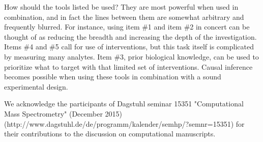 \documentclass[journal=jacsat,manuscript=article]{achemso}
\begin{document}
How should the tools listed be used? They are most powerful when used in
combination, and in fact the lines between them are somewhat arbitrary
and frequently blurred. For instance, using item \#1 and item \#2 in
concert can be thought of as reducing the breadth and increasing the
depth of the investigation. Items \#4 and \#5 call for use of
interventions, but this task itself is complicated by measuring many
analytes. Item
\#3, prior biological knowledge, can be used to prioritize what to
target with that limited set of interventions.  Causal inference becomes possible when using these tools in combination with a sound experimental design.

\begin{acknowledgement}
We acknowledge the participants of Dagstuhl seminar 15351 "Computational Mass Spectrometry" (December 2015) (http://www.dagstuhl.de/de/programm/kalender/semhp/?semnr=15351) for their contributions to the discussion on computational manuscripts.
\end{acknowledgement}

\end{document}
